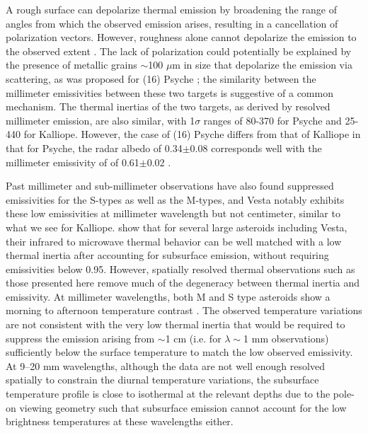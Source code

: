 \documentclass[]{aastex631}
\begin{document}
A rough surface can depolarize thermal emission by broadening the range of angles from which the observed emission arises, resulting in a cancellation of polarization vectors. However, roughness alone cannot depolarize the emission to the observed extent \citep{dekleer2021}. The lack of polarization could potentially be explained by the presence of metallic grains $\sim$100 $\mu$m in size that depolarize the emission via scattering, as was proposed for (16) Psyche \citep{dekleer2021}; the similarity between the millimeter emissivities between these two targets is suggestive of a common mechanism. The thermal inertias of the two targets, as derived by resolved millimeter emission, are also similar, with 1$\sigma$ ranges of 80-370 for Psyche and 25-440 for Kalliope. However, the case of (16) Psyche differs from that of Kalliope in that for Psyche, the radar albedo of 0.34$\pm$0.08 \citep{shepard2021} corresponds well with the millimeter emissivity of of 0.61$\pm$0.02 \citep{dekleer2021}. 

Past millimeter and sub-millimeter observations have also found suppressed emissivities for the S-types as well as the M-types, and Vesta notably exhibits these low emissivities at millimeter wavelength but not centimeter, similar to what we see for Kalliope. \cite{keihm2013} show that for several large asteroids including Vesta, their infrared to microwave thermal behavior can be well matched with a low thermal inertia after accounting for subsurface emission, without requiring emissivities below 0.95. However, spatially resolved thermal observations such as those presented here remove much of the degeneracy between thermal inertia and emissivity. At millimeter wavelengths, both M and S type asteroids show a morning to afternoon temperature contrast \citep[e.g., this paper and also][]{dekleer2021,junoalma}. The observed temperature variations are not consistent with the very low thermal inertia that would be required to suppress the emission arising from $\sim$1 cm (i.e. for $\lambda \sim$1 mm observations) sufficiently below the surface temperature to match the low observed emissivity. At 9--20 mm wavelengths, although the data are not well enough resolved spatially to constrain the diurnal temperature variations, the subsurface temperature profile is close to isothermal at the relevant depths due to the pole-on viewing geometry such that subsurface emission cannot account for the low brightness temperatures at these wavelengths either.  
\end{document}
